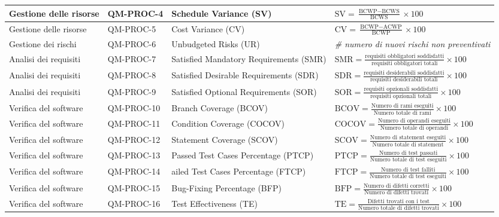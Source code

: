 \begin{center}
\begin{longtable}{|p{2.5cm}|p{2cm}|p{3cm}|p{7.5cm}|}
			\hline
			Gestione delle risorse & QM-PROC-4 & Schedule Variance (SV) & \(\text{SV} = \frac{\text{BCWP} - \text{BCWS}}{\text{BCWS}} \times 100\) \\
			\hline
			Gestione delle risorse & QM-PROC-5 & Cost Variance (CV) & \(\text{CV} = \frac{\text{BCWP} - \text{ACWP}}{\text{BCWP}} \times 100\) \\
			\hline
			Gestione dei rischi & QM-PROC-6 & Unbudgeted Risks (UR) & \textit{\# numero di nuovi rischi non preventivati}  \\
			\hline
			Analisi dei requisiti & QM-PROC-7 & Satisfied Mandatory Requirements (SMR) & \(\text{SMR} = \frac{\text{requisiti obbligatori soddisfatti}}{\text{requisiti obbligatori totali}} \times 100\) \\
			\hline
			Analisi dei requisiti & QM-PROC-8 & Satisfied Desirable Requirements (SDR) & \(\text{SDR} = \frac{\text{requisiti desiderabili soddisfatti}}{\text{requisiti desiderabili totali}} \times 100\) \\
			\hline
			Analisi dei requisiti & QM-PROC-9 & Satisfied Optional Requirements (SOR) & \(\text{SOR} = \frac{\text{requisiti opzionali soddisfatti}}{\text{requisiti opzionali totali}} \times 100\) \\
			\hline
			Verifica del software & QM-PROC-10 & Branch Coverage (BCOV) & \(\text{BCOV} = \frac{\text{Numero di rami eseguiti}}{\text{Numero totale di rami}} \times 100\) \\
			\hline
			Verifica del software & QM-PROC-11 & Condition Coverage (COCOV) & \(\text{COCOV} = \frac{\text{Numero di operandi eseguiti}}{\text{Numero totale di operandi}} \times 100\) \\
			\hline
			Verifica del software & QM-PROC-12 & Statement Coverage (SCOV) & \(\text{SCOV} = \frac{\text{Numero di statement eseguiti}}{\text{Numero totale di statement}} \times 100\) \\
			\hline
			Verifica del software & QM-PROC-13 & Passed Test Cases Percentage (PTCP) & \(\text{PTCP} = \frac{\text{Numero di test passati}}{\text{Numero totale di test eseguiti}} \times 100\) \\
			\hline
			Verifica del software & QM-PROC-14 & ailed Test Cases Percentage (FTCP) & \(\text{FTCP} = \frac{\text{Numero di test falliti}}{\text{Numero totale di test eseguiti}} \times 100\) \\
			\hline
			Verifica del software & QM-PROC-15 & Bug-Fixing Percentage (BFP) & \(\text{BFP} = \frac{\text{Numero di difetti corretti}}{\text{Numero di difetti trovati}} \times 100\) \\
			\hline
			Verifica del software & QM-PROC-16 & Test Effectiveness (TE) & \(\text{TE} = \frac{\text{Difetti trovati con i test}}{\text{Numero totale di difetti trovati}} \times 100\) \\
			\hline
		\end{longtable}
	\end{center}

